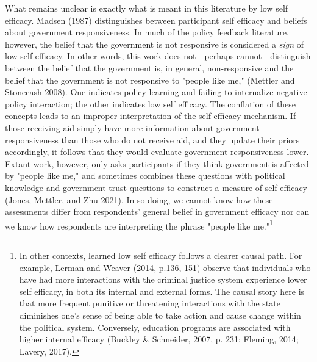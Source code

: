 \documentclass[12pt]{paper}
\begin{document}
What remains unclear is exactly what is meant in this literature by low self efficacy. Madsen (1987) distinguishes between participant self efficacy and beliefs about government responsiveness. In much of the policy feedback literature, however, the belief that the government is not responsive is considered a \textit{sign} of low self efficacy. In other words, this work does not - perhaps cannot - distinguish between the belief that the government is, in general, non-responsive and the belief that the government is not responsive to "people like me," (Mettler and Stonecash 2008). One indicates policy learning and failing to internalize negative policy interaction; the other indicates low self efficacy. The conflation of these concepts leads to an improper interpretation of the self-efficacy mechanism. If those receiving aid simply have more information about government responsiveness than those who do not receive aid, and they update their priors accordingly, it follows that they would evaluate government responsiveness lower. Extant work, however, only asks participants if they think government is affected by "people like me," and sometimes combines these questions with political knowledge and government trust questions to construct a measure of self efficacy (Jones, Mettler, and Zhu 2021). In so doing, we cannot know how these assessments differ from respondents' general belief in government efficacy nor can we know how respondents are interpreting the phrase "people like me."\footnote{In other contexts, learned low self efficacy follows a clearer causal path. For example, Lerman and Weaver (2014, p.136, 151) observe that individuals who have had more interactions with the criminal justice system experience lower self efficacy, in both its internal and external forms. The causal story here is that more frequent punitive or threatening interactions with the state diminishes one's sense of being able to take action and cause change within the political system. Conversely, education programs are associated with higher internal efficacy (Buckley \& Schneider, 2007, p. 231; Fleming, 2014; Lavery, 2017).}
\end{document}
